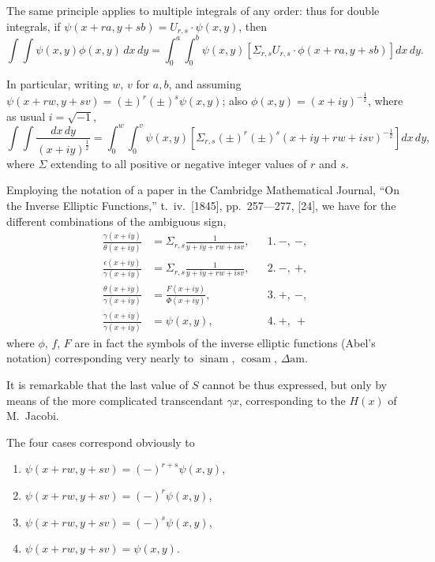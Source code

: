 \documentclass[11pt,a4paper]{book}
\begin{document}
The same principle applies to multiple integrals of any order: thus for double integrals, if $\psi(x+ra, y+sb) = U_{r,s} \cdot \psi(x,y)$, then
\begin{equation}\int\!\!\int \psi(x,y) \phi(x,y) \, dx \, dy = \int_0^a\!\!\int_0^b \psi(x,y) \left[\Sigma_{r,s} U_{r,s} \cdot \phi(x+ra, y+sb)\right] dx \, dy.\tag{B}\end{equation}

In particular, writing $w$, $v$ for $a,b$, and assuming $\psi(x+rw, y+sv) = (\pm)^r (\pm)^s \psi(x,y)$; also $\phi(x,y) = (x+iy)^{-\frac{1}{2}}$, where as usual $i=\sqrt{-1}$,
\[\int\!\!\int \frac{dx \, dy}{(x+iy)^{\frac{1}{2}}} = \int_0^w\!\!\int_0^v \psi(x,y) \left[\Sigma_{r,s} (\pm)^r (\pm)^s (x+iy+rw+isv)^{-\frac{1}{2}}\right] dx \, dy,\]
where $\Sigma$ extending to all positive or negative integer values of $r$ and $s$.

Employing the notation of a paper in the Cambridge Mathematical Journal, ``On the Inverse Elliptic Functions,'' t.\ iv.\ [1845], pp.\ 257---277, [24], we have for the different combinations of the ambiguous sign,
\begin{align*}
\frac{\gamma(x+iy)}{\theta(x+iy)} &= \Sigma_{r,s} \frac{1}{y+iy+rw+isv}, && 1.\ -,\ -,\\
\frac{\epsilon(x+iy)}{\gamma(x+iy)} &= \Sigma_{r,s} \frac{1}{y+iy+rw+isv}, && 2.\ -,\ +,\\
\frac{\theta(x+iy)}{\gamma(x+iy)} &= \frac{F(x+iy)}{\Phi(x+iy)}, && 3.\ +,\ -,\\
\frac{\gamma(x+iy)}{\gamma(x+iy)} &= \psi(x,y), && 4.\ +,\ +
\end{align*}
where $\phi$, $f$, $F$ are in fact the symbols of the inverse elliptic functions (Abel's notation) corresponding very nearly to $\sin \text{am}$, $\cos \text{am}$, $\Delta \text{am}$.

It is remarkable that the last value of $S$ cannot be thus expressed, but only by means of the more complicated transcendant $\gamma x$, corresponding to the $H(x)$ of M.\ Jacobi.

The four cases correspond obviously to
\begin{enumerate}[label=\arabic*.]
\item $\psi(x+rw, y+sv) = (-)^{r+s} \psi(x,y)$,
\item $\psi(x+rw, y+sv) = (-)^r \psi(x,y)$,
\item $\psi(x+rw, y+sv) = (-)^s \psi(x,y)$,
\item $\psi(x+rw, y+sv) = \psi(x,y)$.
\end{enumerate}
\end{document}
